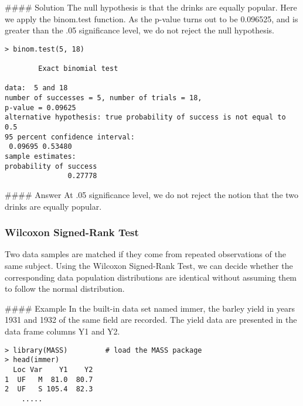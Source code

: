 \begin{frame}[fragile]
#### Solution
The null hypothesis is that the drinks are equally popular. Here we apply the binom.test function. As the p-value turns out to be 0.096525, and is greater than the .05 significance level, we do not reject the null hypothesis.

\end{frame}
\begin{frame}[fragile]
\begin{framed}
\begin{verbatim}
> binom.test(5, 18) 
 
        Exact binomial test 
 
data:  5 and 18 
number of successes = 5, number of trials = 18, 
p-value = 0.09625 
alternative hypothesis: true probability of success is not equal to 0.5 
95 percent confidence interval: 
 0.09695 0.53480 
sample estimates: 
probability of success 
               0.27778
\end{verbatim}
\end{framed}

\end{frame}
\begin{frame}[fragile]              
#### Answer
At .05 significance level, we do not reject the notion that the two drinks are equally popular.

\end{frame}
\begin{frame}[fragile]
\frametitle{Wilcoxon Signed-Rank Test}

Two data samples are matched if they come from repeated observations of the same subject. Using the Wilcoxon Signed-Rank Test, we can decide whether the corresponding data population distributions are identical without assuming them to follow the normal distribution.

\end{frame}
\begin{frame}[fragile]
#### Example
In the built-in data set named immer, the barley yield in years 1931 and 1932 of the same field are recorded. The yield data are presented in the data frame columns Y1 and Y2.
\begin{framed}
\begin{verbatim}
> library(MASS)         # load the MASS package 
> head(immer) 
  Loc Var    Y1    Y2 
1  UF   M  81.0  80.7 
2  UF   S 105.4  82.3 
    .....
\end{verbatim}
\end{framed} 

\end{frame}
